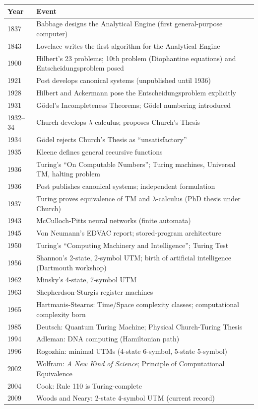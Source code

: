 \begin{tabularx}{\linewidth}{|l|X|}
\hline
\textbf{Year} & \textbf{Event} \\ \hline
1837 & Babbage designs the Analytical Engine (first general-purpose computer) \\ \hline
1843 & Lovelace writes the first algorithm for the Analytical Engine \\ \hline
1900 & Hilbert's 23 problems; 10th problem (Diophantine equations) and Entscheidungsproblem posed \\ \hline
1921 & Post develops canonical systems (unpublished until 1936) \\ \hline
1928 & Hilbert and Ackermann pose the Entscheidungsproblem explicitly \\ \hline
1931 & G\"odel's Incompleteness Theorems; G\"odel numbering introduced \\ \hline
1932--34 & Church develops $\lambda$-calculus; proposes Church's Thesis \\ \hline
1934 & G\"odel rejects Church's Thesis as ``unsatisfactory'' \\ \hline
1935 & Kleene defines general recursive functions \\ \hline
1936 & Turing's ``On Computable Numbers''; Turing machines, Universal TM, halting problem \\ \hline
1936 & Post publishes canonical systems; independent formulation \\ \hline
1937 & Turing proves equivalence of TM and $\lambda$-calculus (PhD thesis under Church) \\ \hline
1943 & McCulloch-Pitts neural networks (finite automata) \\ \hline
1945 & Von Neumann's EDVAC report; stored-program architecture \\ \hline
1950 & Turing's ``Computing Machinery and Intelligence''; Turing Test \\ \hline
1956 & Shannon's 2-state, 2-symbol UTM; birth of artificial intelligence (Dartmouth workshop) \\ \hline
1962 & Minsky's 4-state, 7-symbol UTM \\ \hline
1963 & Shepherdson-Sturgis register machines \\ \hline
1965 & Hartmanis-Stearns: Time/Space complexity classes; computational complexity born \\ \hline
1985 & Deutsch: Quantum Turing Machine; Physical Church-Turing Thesis \\ \hline
1994 & Adleman: DNA computing (Hamiltonian path) \\ \hline
1996 & Rogozhin: minimal UTMs (4-state 6-symbol, 5-state 5-symbol) \\ \hline
2002 & Wolfram: \emph{A New Kind of Science}; Principle of Computational Equivalence \\ \hline
2004 & Cook: Rule 110 is Turing-complete \\ \hline
2009 & Woods and Neary: 2-state 4-symbol UTM (current record) \\ \hline
\end{tabularx}

